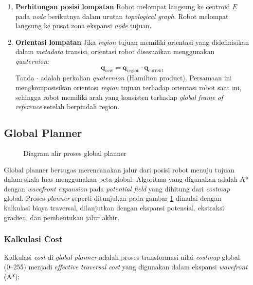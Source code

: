 \begin{enumerate}
  \item \textbf{Perhitungan posisi lompatan} \newline
   Robot melompat langsung ke centroid $E$ pada \emph{node} berikutnya
  dalam urutan \emph{topological graph}.
  Robot melompat langsung ke pusat zona ekspansi \emph{node} tujuan.

  \item \textbf{Orientasi lompatan} \newline
   Jika \emph{region} tujuan memiliki
  orientasi yang didefinisikan dalam \emph{metadata} transisi, orientasi
  robot disesuaikan menggunakan \emph{quaternion}:
  \begin{equation}
  \mathbf{q}_{\text{new}} = \mathbf{q}_{\text{region}} \cdot
  \mathbf{q}_{\text{current}}
  \end{equation}
  Tanda $\cdot$ adalah perkalian \emph{quaternion} (Hamilton product). Persamaan ini mengkomposisikan orientasi
  \emph{region} tujuan terhadap orientasi robot saat ini, sehingga
  robot memiliki arah yang konsisten terhadap \emph{global frame of
  reference} setelah berpindah region.

\end{enumerate}

\subsection{Global Planner}

\begin{figure}[H]
\centering

\caption{Diagram alir proses global planner}
\label{fig:global_planner_flow}
\end{figure}

Global planner bertugas merencanakan jalur dari posisi robot menuju
tujuan dalam skala luas menggunakan peta global. Algoritma yang
digunakan adalah A* dengan \emph{wavefront expansion} pada
\emph{potential field} yang dihitung dari \emph{costmap} global.
Proses \emph{planner} seperti ditunjukan pada gambar \ref{fig:global_planner_flow} dimulai dengan kalkulasi biaya traversal,
dilanjutkan dengan ekspansi potensial, ekstraksi gradien, dan
pembentukan jalur akhir.

\subsubsection{Kalkulasi Cost}

Kalkulasi \emph{cost} di \emph{global planner} adalah proses
transformasi nilai \emph{costmap} global (0--255) menjadi
\emph{effective traversal cost} yang digunakan dalam ekspansi
\emph{wavefront} (A*):

